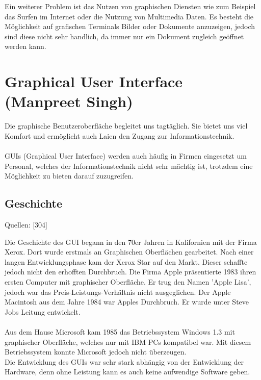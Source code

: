 \documentclass[12pt,a4paper]{report}
\begin{document}
\begin{onehalfspace}
Ein weiterer Problem ist das Nutzen von graphischen Diensten wie zum Beispiel das Surfen im Internet oder die Nutzung von Multimedia Daten. Es besteht die Möglichkeit auf grafischen Terminals Bilder oder Dokumente anzuzeigen, jedoch sind diese nicht sehr handlich, da immer nur ein Dokument zugleich geöffnet werden kann.\\

\newpage
\section{Graphical User Interface (Manpreet Singh)}
Die graphische Benutzeroberfläche begleitet uns tagtäglich. Sie bietet uns viel Komfort und ermöglicht auch Laien den Zugang zur Informationstechnik.\\\\
GUIs (Graphical User Interface) werden auch häufig in Firmen eingesetzt um Personal, welches der Informationstechnik nicht sehr mächtig ist, trotzdem eine Möglichkeit zu bieten darauf zuzugreifen.
\subsection{Geschichte}
\begin{flushright}
\begin{tiny}
Quellen: [304]
\end{tiny}
\end{flushright}
Die Geschichte des GUI begann in den 70er Jahren in Kalifornien mit der Firma Xerox. Dort wurde erstmals an Graphischen Oberflächen gearbeitet. Nach einer langen Entwicklungsphase kam der Xerox Star auf den Markt. Dieser schaffte jedoch nicht den erhofften Durchbruch. Die Firma Apple präsentierte 1983 ihren ersten Computer mit graphischer Oberfläche. Er trug den Namen 'Apple Lisa', jedoch war das Preis-Leistungs-Verhältnis nicht ausgeglichen. Der Apple Macintosh aus dem Jahre 1984 war Apples Durchbruch. Er wurde unter Steve Jobs Leitung entwickelt. \\\\
Aus dem Hause Microsoft kam 1985 das Betriebssystem Windows 1.3 mit graphischer Oberfläche, welches nur mit IBM PCs kompatibel war. Mit diesem Betriebssystem konnte Microsoft jedoch nicht überzeugen.\\

Die Entwicklung des GUIs war sehr stark abhängig von der Entwicklung der Hardware, denn ohne Leistung  kann es auch keine aufwendige Software geben.\\


\end{onehalfspace}
\end{document}
